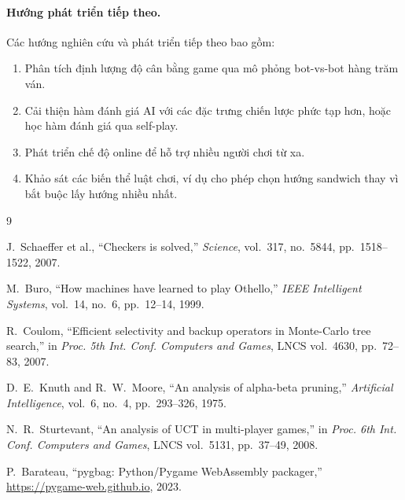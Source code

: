 \documentclass[12pt, a4paper]{article}
\begin{document}
\paragraph{Hướng phát triển tiếp theo.}
Các hướng nghiên cứu và phát triển tiếp theo bao gồm:
\begin{enumerate}[label=(\roman*)]
  \item Phân tích định lượng độ cân bằng game qua mô phỏng bot-vs-bot
        hàng trăm ván.
  \item Cải thiện hàm đánh giá AI với các đặc trưng chiến lược phức
        tạp hơn, hoặc học hàm đánh giá qua self-play.
  \item Phát triển chế độ online để hỗ trợ nhiều người chơi từ xa.
  \item Khảo sát các biến thể luật chơi, ví dụ cho phép chọn hướng
        sandwich thay vì bắt buộc lấy hướng nhiều nhất.
\end{enumerate}

\begin{thebibliography}{9}

  J.~Schaeffer et al.,
  ``Checkers is solved,''
  \textit{Science}, vol.~317, no.~5844, pp.~1518--1522, 2007.

  M.~Buro,
  ``How machines have learned to play Othello,''
  \textit{IEEE Intelligent Systems}, vol.~14, no.~6, pp.~12--14, 1999.

  R.~Coulom,
  ``Efficient selectivity and backup operators in Monte-Carlo tree
  search,'' in \textit{Proc. 5th Int. Conf. Computers and Games},
  LNCS vol.~4630, pp.~72--83, 2007.

  D.~E.~Knuth and R.~W.~Moore,
  ``An analysis of alpha-beta pruning,''
  \textit{Artificial Intelligence}, vol.~6, no.~4, pp.~293--326, 1975.

  N.~R.~Sturtevant,
  ``An analysis of UCT in multi-player games,''
  in \textit{Proc. 6th Int. Conf. Computers and Games},
  LNCS vol.~5131, pp.~37--49, 2008.

  P.~Barateau,
  ``pygbag: Python/Pygame WebAssembly packager,''
  \url{https://pygame-web.github.io}, 2023.

\end{thebibliography}
\end{document}
